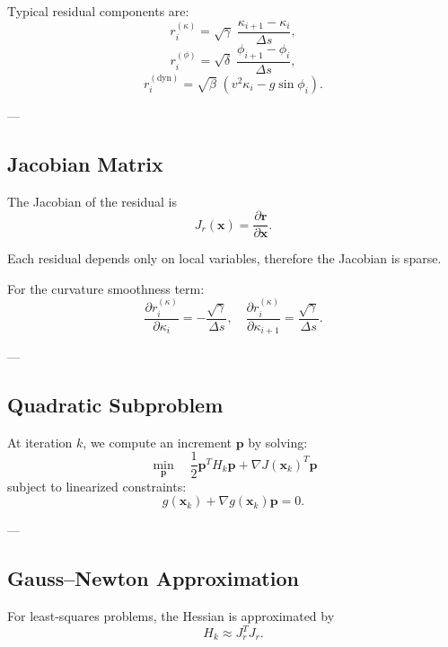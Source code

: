 \begin{remark}
Typical residual components are:
\[
r_i^{(\kappa)} = \sqrt{\gamma}\;
\frac{\kappa_{i+1}-\kappa_i}{\Delta s},
\]
\[
r_i^{(\phi)} = \sqrt{\delta}\;
\frac{\phi_{i+1}-\phi_i}{\Delta s},
\]
\[
r_i^{(\mathrm{dyn})}
=
\sqrt{\beta}\;
(v^2 \kappa_i - g \sin\phi_i).
\]
\end{remark}

---

\subsection{Jacobian Matrix}

\begin{definition}[Jacobian]
The Jacobian of the residual is
\[
J_r(\mathbf{x})
=
\frac{\partial \mathbf{r}}{\partial \mathbf{x}}.
\]
\end{definition}

\begin{remark}
Each residual depends only on local variables, therefore the Jacobian is sparse.
\end{remark}

\begin{example}
For the curvature smoothness term:
\[
\frac{\partial r_i^{(\kappa)}}{\partial \kappa_i}
=
-\frac{\sqrt{\gamma}}{\Delta s},
\quad
\frac{\partial r_i^{(\kappa)}}{\partial \kappa_{i+1}}
=
\frac{\sqrt{\gamma}}{\Delta s}.
\]
\end{example}

---

\subsection{Quadratic Subproblem}

\begin{definition}
At iteration \(k\), we compute an increment \(\mathbf{p}\) by solving:
\[
\min_{\mathbf{p}}
\quad
\frac{1}{2} \mathbf{p}^T H_k \mathbf{p}
+
\nabla J(\mathbf{x}_k)^T \mathbf{p}
\]
subject to linearized constraints:
\[
g(\mathbf{x}_k) + \nabla g(\mathbf{x}_k)\mathbf{p} = 0.
\]
\end{definition}

---

\subsection{Gauss--Newton Approximation}

\begin{remark}
For least-squares problems, the Hessian is approximated by
\[
H_k \approx J_r^T J_r.
\]
\end{remark}

